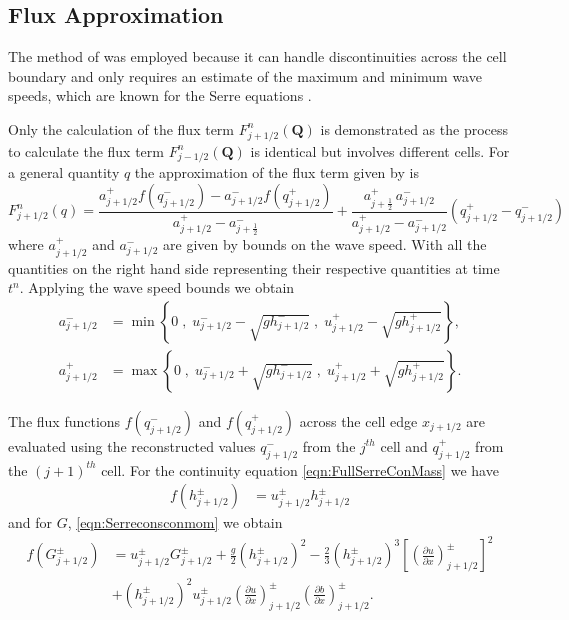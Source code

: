 \documentclass[AMA,STIX1COL]{WileyNJD-v2}
\newcommand{\vecn}[1]{\boldsymbol{#1}}
\begin{document}
\subsection{Flux Approximation}
The method of \citet{Kurganov-etal-2001-707} was employed because it can handle discontinuities across the cell boundary and only requires an estimate of the maximum and minimum wave speeds, which are known for the Serre equations \cite{Zoppou-etal-2017}.

Only the calculation of the flux term $F^n_{j+1/2}\left(\vecn{Q} \right)$ is demonstrated as the process to calculate the flux term $F^n_{j-1/2}\left(\vecn{Q} \right)$ is identical but involves different cells. For a general quantity $q$ the approximation of the flux term given by \citet{Kurganov-etal-2001-707} is
\begin{equation}\label{eqn:HLL_flux}
F^n_{j+1/2}(q) = \dfrac{a^+_{j+1/2} f\left(q^-_{j+1/2}\right) - a^-_{j+1/2} f\left(q^+_{j+1/2}\right)}{a^+_{j+1/2} - a^-_{j+\frac{1}{2}}}  + \dfrac{a^+_{j+\frac{1}{2}} \, a^-_{j+1/2}}{a^+_{j+1/2} - a^-_{j+1/2}} \left(  q^+_{j+1/2} - q^-_{j+1/2} \right)
\end{equation}
where $a^+_{j+1/2}$ and $a^-_{j+1/2}$ are given by bounds on the wave speed. With all the quantities on the right hand side representing their respective quantities at time $t^n$. Applying the wave speed bounds \cite{Zoppou-etal-2017} we obtain
\begin{subequations}
\begin{align}
a^-_{j+{1}/{2}} &= \min\left\lbrace 0\;,\;  u^-_{j + 1/2} - \sqrt{g  {h}^-_{j + 1/2}}  \;,\;u^+_{j + 1/2} - \sqrt{g  {h}^+_{j + 1/2}} \right\rbrace  ,\\
a^+_{j+1/2} &= \max\left\lbrace 0 \;,\;  u^-_{j + 1/2} + \sqrt{g {h}^-_{j + 1/2}}  \;,\;u^+_{j + 1/2} + \sqrt{g  {h}^+_{j + 1/2}} \right\rbrace .
\end{align}
\label{eqn:WaveSpeedBoundsFluxApprox}
\end{subequations}

The flux functions $f(q^-_{j+1/2})$ and $f(q^+_{j+1/2})$ across the cell edge $x_{j+1/2}$ are evaluated using the reconstructed values $q^-_{j+1/2}$ from the $j^{th}$ cell and $q^+_{j+1/2}$ from the $(j+1)^{th}$ cell. For the continuity equation \eqref{eqn:FullSerreConMass} we have
\begin{align}
f\left(h^\pm_{j+1/2}\right) &= u^\pm_{j + 1/2}  {h}^\pm_{j + 1/2}
\label{eqn:FluxMassNum}
\end{align}
and for $G$, \eqref{eqn:Serreconsconmom} we obtain
\begin{align}
f\left(G^\pm_{j+1/2}\right) &=  u^\pm_{j + 1/2} G^\pm_{j + 1/2}  + \frac{g}{2}\left({h}^\pm_{j + 1/2} \right)^2 - \frac{2}{3}\left({h}^\pm_{j + 1/2}\right)^3 \left[\left(\frac{\partial {u}}{\partial x} \right)^\pm_{j + 1/2} \right]^2 \nonumber\\ &+ \left({h}^\pm_{j + 1/2}\right)^2 u^\pm_{j + 1/2} \left(\frac{\partial {u}}{\partial x} \right)^\pm_{j + 1/2} \left(\frac{\partial b}{\partial x} \right)^\pm_{j + 1/2} .
\label{eqn:FluxIrrotNum}
\end{align}
\end{document}
